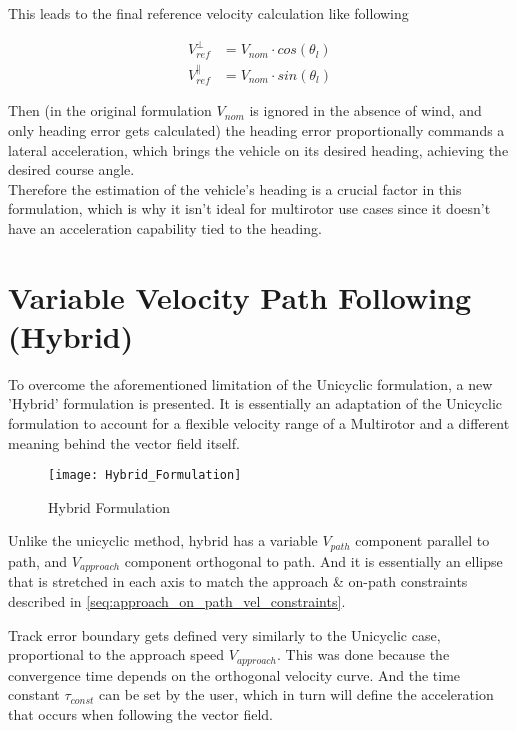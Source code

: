 This leads to the final reference velocity calculation like following

\begin{equation}
    \begin{split}
        V_{ref}^{\perp} &= V_{nom} \cdot cos(\theta_l)\\
        V_{ref}^{\parallel} &= V_{nom} \cdot sin(\theta_l)
    \end{split}
\label{eq:hybrid_velocity_components}
\end{equation}

Then (in the original formulation $V_{nom}$ is ignored in the absence of wind, and only heading error gets calculated) the heading error proportionally commands a lateral acceleration, which brings the vehicle on its desired heading, achieving the desired course angle.\\

Therefore the estimation of the vehicle's heading is a crucial factor in this formulation, which is why it isn't ideal for multirotor use cases since it doesn't have an acceleration capability tied to the heading.

\section{Variable Velocity Path Following (Hybrid)}

To overcome the aforementioned limitation of the Unicyclic formulation, a new 'Hybrid' formulation is presented. It is essentially an adaptation of the Unicyclic formulation to account for a flexible velocity range  of a Multirotor and a different meaning behind the vector field itself.

\begin{figure}[h]
\centering
\texttt{[image: Hybrid\_Formulation]}
\caption{Hybrid Formulation}
\end{figure}

Unlike the unicyclic method, hybrid has a variable $V_{path}$ component parallel to path, and $V_{approach}$ component orthogonal to path. And it is essentially an ellipse that is stretched in each axis to match the approach \& on-path constraints described in \autoref{seq:approach_on_path_vel_constraints}.

Track error boundary gets defined very similarly to the Unicyclic case, proportional to the approach speed $V_{approach}$. This was done because the convergence time depends on the orthogonal velocity curve. And the time constant $\tau_{const}$ can be set by the user, which in turn will define the acceleration that occurs when following the vector field.

